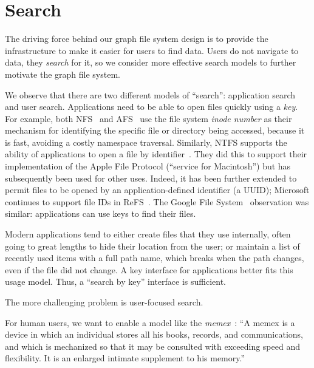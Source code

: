 \section{Search}\label{sec:search}

The driving force behind our graph file system design is to provide the
infrastructure to make it easier for users to find data.
Users do not navigate to data, they \textit{search} for it, so we
consider more effective search models to further
motivate the graph file system.

We observe that there are two different models of ``search'': application
search and user search.
Applications need to be able to open files quickly 
using a \textit{key}. For example, both NFS~\cite{sandberg1986sun}
and AFS~\cite{sidebotham1986volumes} use the file system \textit{inode number} as their
mechanism for identifying the specific file or directory being accessed,
because it is fast, avoiding a costly namespace traversal.
Similarly, NTFS supports the ability of applications to open a file by 
identifier~\cite{sreenivas2011bypass}.
They did this to support their implementation
of the Apple File Protocol (``service for Macintosh'') but has subsequently been used
for other uses. Indeed, it has been further extended to permit files to be opened by an
application-defined identifier (a UUID); Microsoft continues to support file IDs in 
ReFS~\cite{microsoft:refs:features}. The Google File System~\cite{Ghemawat2003} 
observation was similar: applications can use keys to find their files.

Modern applications tend to either create files that they use internally, often going to great lengths
to hide their location from the user; or maintain a list of recently used items with a full path name,
which breaks when the path changes, even if the file did not change.  A key interface for applications
better fits this usage model. Thus, a ``search by key'' interface is sufficient.

The more challenging problem is user-focused search.
\begin{comment}
Many of the
characteristics in a good human usable search system do not benefit the programs
directly.
\end{comment}
For human users, we want to enable a model like the
\textit{memex}~\cite{bush1945we}: ``A memex is a device in which an individual stores
all his books, records, and communications, and which is mechanized so that it may be
consulted with exceeding speed and flexibility. It is an enlarged intimate supplement
to his memory.''

